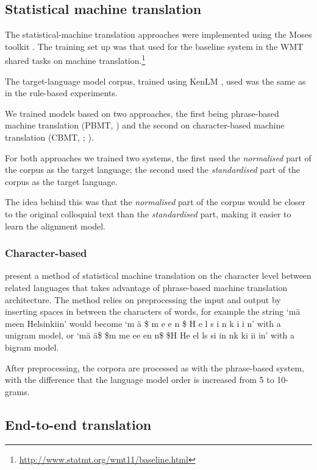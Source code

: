 \documentclass[11pt]{article}
\begin{document}
\subsection{Statistical machine translation}

The statistical-machine translation approaches were implemented using the 
Moses toolkit \cite{koehn2007}. The training set up was that used for
the baseline system in the WMT shared tasks
on machine translation.\footnote{\url{http://www.statmt.org/wmt11/baseline.html}}

The target-language model corpus, trained using KenLM \cite{heafield2011}, used was the same as in the rule-based experiments.  

We trained models based on two approaches, the first being phrase-based machine translation (PBMT, ) and the second on character-based machine translation (CBMT, ; ).

For both approaches we trained two systems, the first used the \emph{normalised}
part of the corpus as the target language; the second used the \emph{standardised} 
part of the corpus as the target language.

The idea behind this was that the \emph{normalised} part of the corpus would be closer
to the original colloquial text than the \emph{standardised} part, making it easier
to learn the alignment model. 

\subsubsection{Character-based}

 present a method of statistical machine translation on the character level between related languages that takes advantage of phrase-based machine translation architecture. The method relies on preprocessing the input and output by inserting spaces in between the characters of words, for example the string `m\"{a} meen Helsinkiin' would become `m \"{a} \$ m e e n \$ H e l s i n k i i n' with a unigram model, or `m\"{a} \"{a}\$ \$m me ee en n\$ \$H He el ls si in nk ki ii in' with a bigram model.

After preprocessing, the corpora are processed as with the phrase-based system, with the difference that the language model order is increased from 5 to 10-grams.

\subsection{End-to-end translation}
\end{document}
